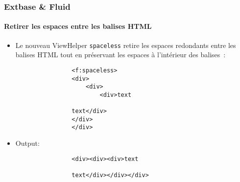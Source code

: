 \begin{frame}[fragile]
	\frametitle{Extbase \& Fluid}
	\framesubtitle{Retirer les espaces entre les balises HTML}

	\begin{itemize}

		\item Le nouveau ViewHelper \texttt{spaceless} retire les espaces redondants entre les
			balises HTML tout en préservant les espaces à l'intérieur des balises~:

			\begin{lstlisting}
				<f:spaceless>
				<div>
				    <div>
				        <div>text

				text</div>
				</div>
				</div>
			\end{lstlisting}

		\item Output:

			\begin{lstlisting}
				<div><div><div>text

				text</div></div></div>
			\end{lstlisting}

	\end{itemize}

\end{frame}


